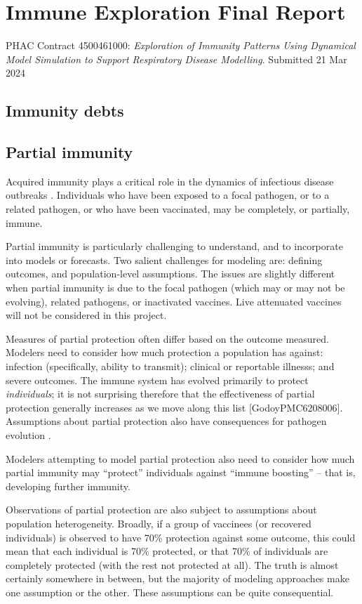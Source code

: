 \documentclass[12pt]{article}
\begin{document}
\section*{Immune Exploration Final Report}

PHAC Contract 4500461000: \emph{Exploration of Immunity Patterns Using Dynamical
Model Simulation to Support Respiratory Disease
Modelling}. Submitted 21 Mar 2024

\subsection*{Immunity debts}

\subsection*{Partial immunity}

\bigskip\noindent Acquired immunity plays a critical role in the dynamics of infectious disease outbreaks \cite{anderson1985vaccination}. Individuals who have been exposed to a focal pathogen, or to a related pathogen, or who have been vaccinated, may be completely, or partially, immune.

Partial immunity is particularly challenging to understand, and to incorporate into models or forecasts. Two salient challenges for modeling are: defining outcomes, and population-level assumptions. The issues are slightly different when partial immunity is due to the focal pathogen (which may or may not be evolving), related pathogens, or inactivated vaccines. Live attenuated vaccines will not be considered in this project.

Measures of partial protection often differ based on the outcome measured. Modelers need to consider how much protection a population has against: infection (specifically, ability to transmit); clinical or reportable illnesss; and severe outcomes. The immune system has evolved primarily to protect \emph{individuals}; it is not surprising therefore that the effectiveness of partial protection generally increases as we move along this list [GodoyPMC6208006]. Assumptions about partial protection also have consequences for pathogen evolution \cite{gandon2003imperfect}.

Modelers attempting to model partial protection also need to consider how much partial immunity may “protect” individuals against “immune boosting” -- that is, developing further immunity.

Observations of partial protection are also subject to assumptions about population heterogeneity. Broadly, if a group of vaccinees (or recovered individuals) is observed to have 70\% protection against some outcome, this could mean that each individual is 70\% protected, or that 70\% of individuals are completely protected (with the rest not protected at all). The truth is almost certainly somewhere in between, but the majority of modeling approaches make one assumption or the other. These assumptions can be quite consequential.
\end{document}
